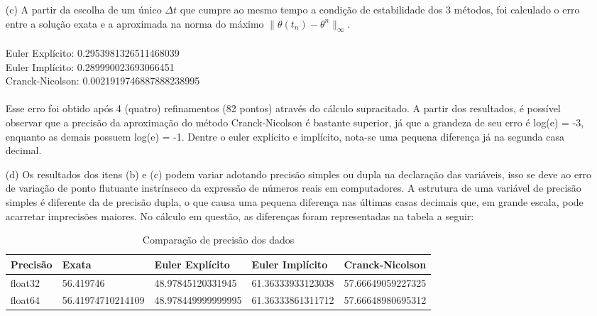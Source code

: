 \documentclass{article}
\begin{document}
\begin{itemize}
\begin{itemize}
 
 \item[(c)] A partir da escolha de um único $\Delta t$ que cumpre ao mesmo tempo a condição de estabilidade dos 3 métodos, foi calculado o erro entre a solução exata e a aproximada na norma do máximo $\|\theta(t_n) - \theta^n\|_{\infty}$.\\\\
 Euler Explícito: 0.2953981326511468039\\
Euler Implícito: 0.289990023693066451\\
 Cranck-Nicolson: 0.0021919746887888238995\\
 \\ 
 Esse erro foi obtido após 4 (quatro) refinamentos (82 pontos) através do cálculo supracitado. A partir dos resultados, é possível observar que a precisão da aproximação do método Cranck-Nicolson é bastante superior, já que a grandeza de seu erro é log(e) = -3, enquanto as demais possuem log(e) = -1. Dentre o euler explícito e implícito, nota-se uma pequena diferença já na segunda casa decimal. \\
 
 \item[(d)] Os resultados dos itens (b) e (c) podem variar adotando precisão simples ou dupla na declaração das variáveis, isso se deve ao erro de variação de ponto flutuante instrínseco da expressão de números reais em computadores. A estrutura de uma variável de precisão simples é diferente da de precisão dupla, o que causa uma pequena diferença nas últimas casas decimais que, em grande escala, pode acarretar imprecisões maiores. No cálculo em questão, as diferenças foram representadas na tabela a seguir:
 
\begin{table}[h]
\caption{Comparação de precisão dos dados}
\begin{tabular}{|l|l|l|l|l|}
\hline
Precisão & Exata             & Euler Explícito    & Euler Implícito   & Cranck-Nicolson   \\ \hline
float32  & 56.419746         & 48.97845120331945  & 61.36333933123038 & 57.66649059227325 \\ \hline
float64    & 56.41974710214109 & 48.978449999999995 & 61.36333861311712 & 57.66648980695312 \\ \hline
\end{tabular}
\end{table}


\end{itemize}
\end{itemize}
\end{document}
